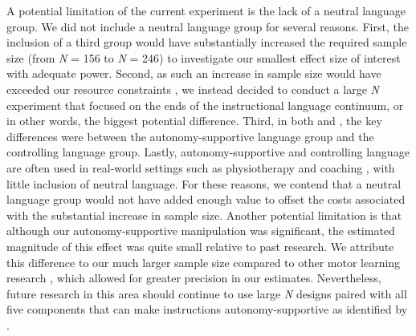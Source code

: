\documentclass[man,floatsintext,donotrepeattitle,letterpaper,12pt]{apa7}
\begin{document}
A potential limitation of the current experiment is the lack of a neutral language group. We did not include a neutral language group for several reasons. First, the inclusion of a third group would have substantially increased the required sample size (from \emph{N} = 156 to \emph{N} = 246) to investigate our smallest effect size of interest with adequate power. Second, as such an increase in sample size would have exceeded our resource constraints \autocite{lakens2022,lenth2001}, we instead decided to conduct a large \emph{N} experiment that focused on the ends of the instructional language continuum, or in other words, the biggest potential difference. Third, in both \textcite{reeve2011} and \textcite{hooyman2014}, the key differences were between the autonomy-supportive language group and the controlling language group. Lastly, autonomy-supportive and controlling language are often used in real-world settings such as physiotherapy \autocite[e.g.,][]{murray2015} and coaching \autocite[e.g.,][]{bartholomew2009,carroll2021}, with little inclusion of neutral language. For these reasons, we contend that a neutral language group would not have added enough value to offset the costs associated with the substantial increase in sample size. Another potential limitation is that although our autonomy-supportive manipulation was significant, the estimated magnitude of this effect was quite small relative to past research. We attribute this difference to our much larger sample size compared to other motor learning research \autocite[e.g.,][]{hooyman2014}, which allowed for greater precision in our estimates. Nevertheless, future research in this area should continue to use large \emph{N} designs paired with all five components that can make instructions autonomy-supportive as identified by \textcite{su2011}.

\end{document}
